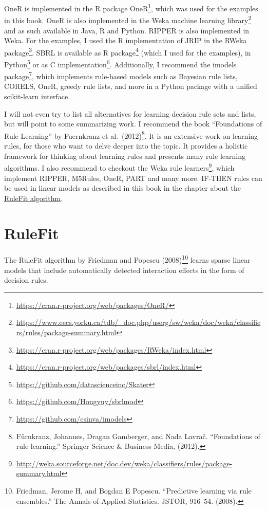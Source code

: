 \documentclass[
  10pt,
]{scrbook}
\renewcommand{\href}[2]{#2\footnote{\url{#1}}}
\begin{document}
OneR is implemented in the \href{https://cran.r-project.org/web/packages/OneR/}{R package OneR}, which was used for the examples in this book.
OneR is also implemented in the \href{https://www.eecs.yorku.ca/tdb/_doc.php/userg/sw/weka/doc/weka/classifiers/rules/package-summary.html}{Weka machine learning library} and as such available in Java, R and Python.
RIPPER is also implemented in Weka. For the examples, I used the R implementation of JRIP in the \href{https://cran.r-project.org/web/packages/RWeka/index.html}{RWeka package}.
SBRL is available as \href{https://cran.r-project.org/web/packages/sbrl/index.html}{R package} (which I used for the examples), in \href{https://github.com/datascienceinc/Skater}{Python} or as \href{https://github.com/Hongyuy/sbrlmod}{C implementation}.
Additionally, I recommend the \href{https://github.com/csinva/imodels}{imodels package}, which implements rule-based models such as Bayesian rule lists, CORELS, OneR, greedy rule lists, and more in a Python package with a unified scikit-learn interface.

I will not even try to list all alternatives for learning decision rule sets and lists, but will point to some summarizing work.
I recommend the book ``Foundations of Rule Learning'' by Fuernkranz et al.~(2012)\footnote{Fürnkranz, Johannes, Dragan Gamberger, and Nada Lavrač. ``Foundations of rule learning.'' Springer Science \& Business Media, (2012).}.
It is an extensive work on learning rules, for those who want to delve deeper into the topic.
It provides a holistic framework for thinking about learning rules and presents many rule learning algorithms.
I also recommend to checkout the \href{http://weka.sourceforge.net/doc.dev/weka/classifiers/rules/package-summary.html}{Weka rule learners}, which implement RIPPER, M5Rules, OneR, PART and many more.
IF-THEN rules can be used in linear models as described in this book in the chapter about the \protect\hyperlink{rulefit}{RuleFit algorithm}.

\newpage

\hypertarget{rulefit}{%
\section{RuleFit}\label{rulefit}}

The RuleFit algorithm by Friedman and Popescu (2008)\footnote{Friedman, Jerome H, and Bogdan E Popescu. ``Predictive learning via rule ensembles.'' The Annals of Applied Statistics. JSTOR, 916--54. (2008).} learns sparse linear models that include automatically detected interaction effects in the form of decision rules.
\end{document}
